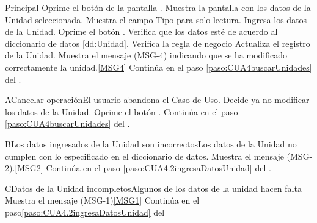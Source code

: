 	\begin{UCtrayectoria}{Principal}
			\UCpaso[\UCactor] Oprime el botón  de la pantalla .
			\UCpaso Muestra la pantalla  con los datos de la Unidad seleccionada.
			\UCpaso Muestra el campo Tipo para solo lectura.
			\UCpaso [\UCactor] Ingresa los datos de la Unidad.\label{paso:CUA4.2ingresaDatosUnidad}
			\UCpaso [\UCactor] Oprime el botón .
			\UCpaso Verifica que los datos esté de acuerdo al diccionario de datos \ref{dd:Unidad}.  
			\UCpaso Verifica la regla de negocio 
			\UCpaso Actualiza el registro de la Unidad.
			\UCpaso Muestra el mensaje (MSG-4) indicando que se ha modificado correctamente la unidad.\ref{MSG4}
			\UCpaso Continúa en el paso \ref{paso:CUA4buscarUnidades} del .
	\end{UCtrayectoria}

		\begin{UCtrayectoriaA}{A}{Cancelar operación}{El usuario abandona el Caso de Uso.}
			\UCpaso[\UCactor] Decide ya no modificar los datos de la Unidad.
			\UCpaso[\UCactor] Oprime el botón .
			\UCpaso Continúa en el paso \ref{paso:CUA4buscarUnidades} del .
		\end{UCtrayectoriaA}
		\begin{UCtrayectoriaA}{B}{Los datos ingresados de la Unidad son incorrectos}{Los datos de la Unidad no cumplen con lo especificado en el diccionario de datos.}
			\UCpaso Muestra el mensaje (MSG-2).\ref{MSG2}
			\UCpaso Continúa en el paso \ref{paso:CUA4.2ingresaDatosUnidad} del .
		\end{UCtrayectoriaA}
		
		\begin{UCtrayectoriaA}{C}{Datos de la Unidad incompletos}{Algunos de los datos de la unidad hacen falta}
		 	\UCpaso Muestra el mensaje (MSG-1)\ref{MSG1}
			\UCpaso Continúa en el paso\ref{paso:CUA4.2ingresaDatosUnidad} del 
		\end{UCtrayectoriaA}






